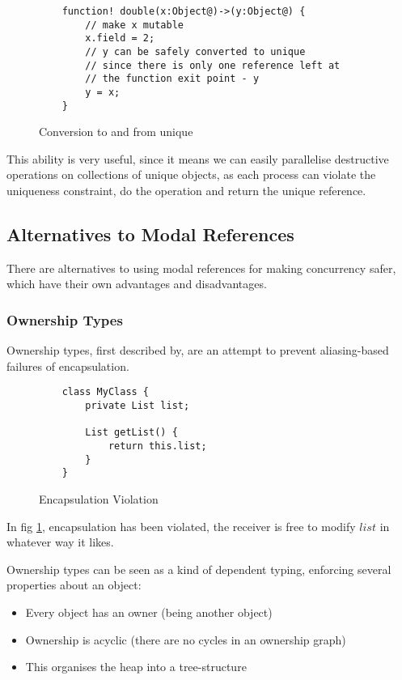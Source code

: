 \documentclass{article}
\begin{document}
\begin{figure}[H]
\begin{verbatim}
    function! double(x:Object@)->(y:Object@) {
        // make x mutable
        x.field = 2;
        // y can be safely converted to unique
        // since there is only one reference left at
        // the function exit point - y
        y = x;
    }
\end{verbatim}
\caption{Conversion to and from unique}
\end{figure}

This ability is very useful, since it means we can easily parallelise
destructive operations on collections of unique objects, as each process can
violate the uniqueness constraint, do the operation and return the unique
reference.

\subsection{Alternatives to Modal References}

There are alternatives to using modal references for making concurrency safer,
which have their own advantages and disadvantages.

\subsubsection{Ownership Types}

Ownership types, first described by\cite{clarke1998}, are an attempt to prevent aliasing-based
failures of encapsulation.

\begin{figure}[H]
\begin{verbatim}
    class MyClass {
        private List list;
    
        List getList() {
            return this.list;
        }
    }
\end{verbatim}
\caption{Encapsulation Violation}
\label{fig:encapsulation}
\end{figure}

In fig \ref{fig:encapsulation}, encapsulation has been violated, the receiver is
free to modify $list$ in whatever way it likes.

Ownership types can be seen as a kind of dependent typing, enforcing
several properties about an object:

\begin{itemize}
\item Every object has an owner (being another object)
\item Ownership is acyclic (there are no cycles in an ownership graph)
\item This organises the heap into a tree-structure
\end{itemize}
\end{document}
